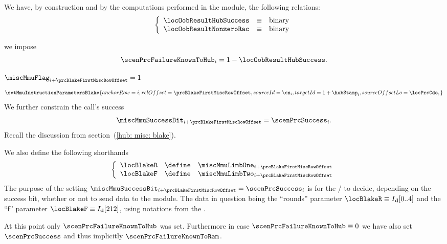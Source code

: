 \begin{description}
\begin{description}
				\saNote{} We have, by construction and by the computations performed in the \oobMod{} module, the following relations:
				\[
					\left\{ \begin{array}{lcl}
					        \locOobResultHubSuccess & \equiv & \text{binary} \\
					        \locOobResultNonzeroRac & \equiv & \text{binary} \\
					\end{array} \right.
				\]
			\item[\underline{Setting \scenPrcFailureKnownToHub{}:}] 
				we impose
				\[
					\scenPrcFailureKnownToHub_{i} = 1 - \locOobResultHubSuccess.
				\]
			\item[\underline{Setting the \mmuMod{} instruction:}]
				\If $\miscMmuFlag_{i + \prcBlakeFirstMiscRowOffset} = 1$ \Then
				\[
					\setMmuInstructionParametersBlake {
						anchorRow      = i                           ,
						relOffset      = \prcBlakeFirstMiscRowOffset ,
						sourceId       = \cn_{i}                     ,
						targetId       = 1 + \hubStamp_{i}           ,
						sourceOffsetLo = \locPrcCdo                  ,
					}
				\]
				We further constrain the call's success
				\[
					\miscMmuSuccessBit_{i + \prcBlakeFirstMiscRowOffset}
					=
					\scenPrcSuccess_{i}.
				\]
				\saNote{} Recall the discussion from section~(\ref{hub: misc: blake}).

				\saNote{} We also define the following shorthands
				\[
					\left\{ \begin{array}{lcl} \label{hub: instruction handling: call: precompiles: blake: shorthands}
						\locBlakeR & \define & \miscMmuLimbOne _{i + \prcBlakeFirstMiscRowOffset} \\
						\locBlakeF & \define & \miscMmuLimbTwo _{i + \prcBlakeFirstMiscRowOffset} \\
					\end{array} \right.
				\]
				\saNote{}
				The purpose of the setting $\miscMmuSuccessBit _{i + \prcBlakeFirstMiscRowOffset} = \scenPrcSuccess _{i}$ is for the \mmuMod{} / \mmioMod{} to decide, depending on the success bit, whether or not to send data to the \blakeDataMod{} module.
				The data in question being the ``rounds'' parameter $\locBlakeR \equiv I_\textbf{d}[0..4]$ and the ``f'' parameter $\locBlakeF \equiv I_\textbf{d}[212]$, using notations from the \cite{EYP-London}.

				\saNote{}
				At this point only $\scenPrcFailureKnownToHub$ was set.
				Furthermore in case $\scenPrcFailureKnownToHub \equiv 0$ we have also set $\scenPrcSuccess$ and thus implicitly $\scenPrcFailureKnownToRam$.
		\end{description}
	\end{description}
